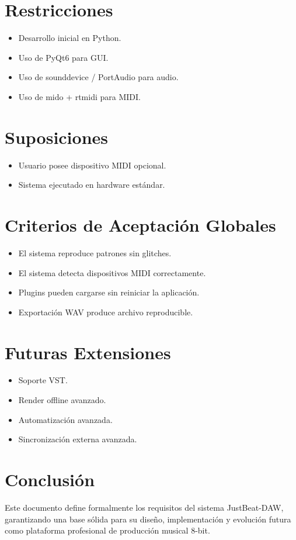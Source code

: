 \documentclass[12pt]{article}
\begin{document}
\section{Restricciones}

\begin{itemize}
\item Desarrollo inicial en Python.
\item Uso de PyQt6 para GUI.
\item Uso de sounddevice / PortAudio para audio.
\item Uso de mido + rtmidi para MIDI.
\end{itemize}

\section{Suposiciones}

\begin{itemize}
\item Usuario posee dispositivo MIDI opcional.
\item Sistema ejecutado en hardware estándar.
\end{itemize}

\section{Criterios de Aceptación Globales}

\begin{itemize}
\item El sistema reproduce patrones sin glitches.
\item El sistema detecta dispositivos MIDI correctamente.
\item Plugins pueden cargarse sin reiniciar la aplicación.
\item Exportación WAV produce archivo reproducible.
\end{itemize}

\section{Futuras Extensiones}

\begin{itemize}
\item Soporte VST.
\item Render offline avanzado.
\item Automatización avanzada.
\item Sincronización externa avanzada.
\end{itemize}

\section{Conclusión}

Este documento define formalmente los requisitos del sistema JustBeat-DAW, garantizando una base sólida para su diseño, implementación y evolución futura como plataforma profesional de producción musical 8-bit.
\end{document}
